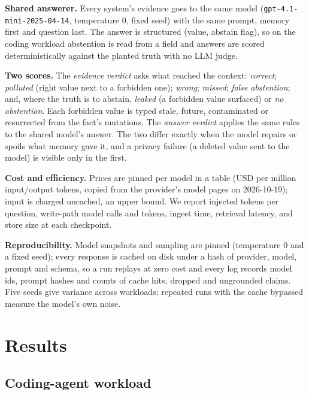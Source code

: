 \documentclass[10pt,conference]{IEEEtran}
\begin{document}
\textbf{Shared answerer.} Every system's evidence goes to the same model
(\texttt{gpt-4.1-mini-2025-04-14}, temperature 0, fixed seed) with the same
prompt, memory first and question last. The answer is structured (value,
abstain flag), so on the coding workload abstention is read from a field and
answers are scored deterministically against the planted truth with no LLM
judge.

\textbf{Two scores.} The \emph{evidence verdict} asks what reached the
context: \emph{correct}; \emph{polluted} (right value next to a forbidden
one); \emph{wrong}; \emph{missed}; \emph{false abstention}; and, where the
truth is to abstain, \emph{leaked} (a forbidden value surfaced) or \emph{no
abstention}. Each forbidden value is typed stale, future, contaminated or
resurrected from the fact's mutations. The \emph{answer verdict} applies the
same rules to the shared model's answer. The two differ exactly when the model
repairs or spoils what memory gave it, and a privacy failure (a deleted value
sent to the model) is visible only in the first.

\textbf{Cost and efficiency.} Prices are pinned per model in a table
(USD per million input/output tokens, copied from the provider's model pages
on 2026-10-19); input is charged uncached, an upper bound. We report injected
tokens per question, write-path model calls and tokens, ingest time,
retrieval latency, and store size at each checkpoint.

\textbf{Reproducibility.} Model snapshots and sampling are pinned (temperature
0 and a fixed seed); every response is cached on disk under a hash of
provider, model, prompt and schema, so a run replays at zero cost and every
log records model ids, prompt hashes and counts of cache hits, dropped and
ungrounded claims. Five seeds give variance across workloads; repeated runs
with the cache bypassed measure the model's own noise.

\section{Results}
\label{sec:results}

\subsection{Coding-agent workload}
\end{document}
